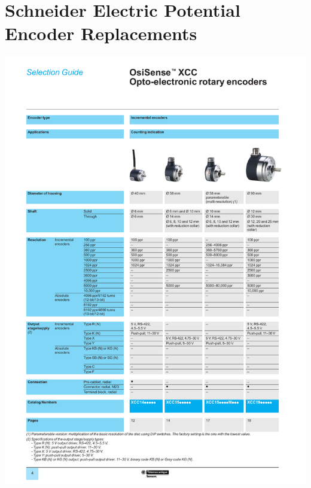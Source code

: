 \section{Schneider Electric Potential Encoder Replacements}
\begin{center}
	\includegraphics[width=5.5in]{afiles/9006CT1101 Encoders.pdf}
	\label{xcc} %
\end{center}
